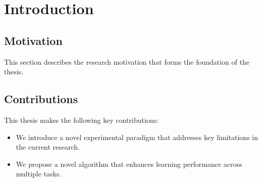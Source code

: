 \chapter{Introduction}
\label{chapter1}

\section{Motivation}
\label{ch1:sec:motivation}
\begin{paragraph}
This section describes the research motivation that forms the foundation of the thesis.
\end{paragraph}

\section{Contributions}
\label{ch1:sec:Contributions}
\begin{paragraph}
This thesis makes the following key contributions:
\end{paragraph}

\begin{itemize}[leftmargin=\paritemindent]
    \item We introduce a novel experimental paradigm that addresses key limitations in the current research.
    \item We propose a novel algorithm that enhances learning performance across multiple tasks.
\end{itemize}

